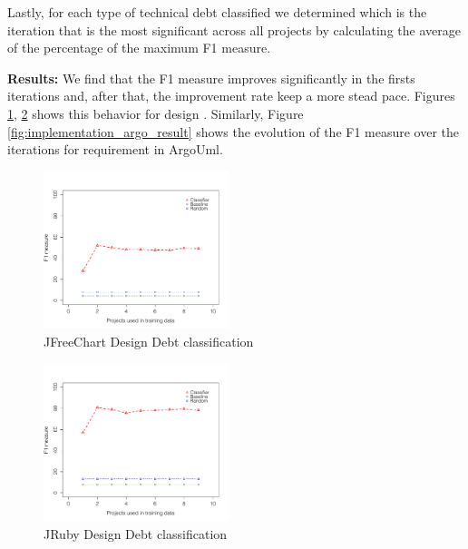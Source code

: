 Lastly, for each type of technical debt classified we determined which is the iteration that is the most significant across all projects by calculating the average of the percentage of the maximum F1 measure.

\vspace{1mm}
\noindent \textbf{Results:} We find that the F1 measure improves significantly in the firsts iterations and, after that, the improvement rate keep a more stead pace. Figures \ref{fig:design_jfreechart_result}, \ref{fig:design_jruby_result} shows this behavior for design \SATD. Similarly, Figure \ref{fig:implementation_argo_result} shows the evolution of the F1 measure over the iterations for requirement \SATD in ArgoUml. 

\begin{figure}[thb!]
   \centering
  \includegraphics[width=0.48\textwidth]{figures/design_jfreechart.pdf}
  \vspace{-3mm}
  \caption{JFreeChart Design Debt classification}
  \label{fig:design_jfreechart_result}
\end{figure}
 
\begin{figure}[thb!]
  \centering
  \includegraphics[width=0.48\textwidth]{figures/design_jruby.pdf}
  \vspace{-3mm}
  \caption{JRuby Design Debt classification}
  \label{fig:design_jruby_result}
\end{figure}

